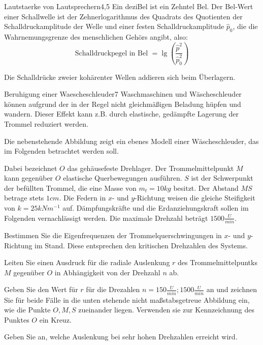 \begin{problem}{Lautstaerke von Lautsprechern}{4,5}
\hinweis Ein deziBel ist ein Zehntel Bel.  Der Bel-Wert einer Schallwelle ist der Zehnerlogarithmus des Quadrats des Quotienten der Schalldruckamplitude der Welle und einer festen Schalldruckamplitude $\hat{p}_0$, die die Wahrnemungsgrenze des menschlichen Gehörs angibt, also:
\begin{equation*}
  \mbox{Schalldruckpegel in Bel\ } = \lg\left(\frac{\hat{p}^2}{\hat{p}_0^2}\right)
\end{equation*}

Die Schalldrücke zweier kohärenter Wellen addieren sich beim Überlagern.
\begin{solution}
  
\end{solution}
\end{problem}

\begin{problem}{Beruhigung einer Waescheschleuder}{7}
Waschmaschinen und Wäscheschleuder können aufgrund der in der Regel nicht gleichmäßigen Beladung hüpfen und wandern. Dieser Effekt kann z.B. durch elastische, gedämpfte Lagerung der Trommel reduziert werden.

Die nebenstehende Abbildung zeigt ein ebenes Modell einer Wäscheschleuder, das im Folgenden betrachtet werden soll.


Dabei bezeichnet $O$ das gehäusefeste Drehlager.  Der Trommelmittelpunkt $M$ kann gegenüber $O$ elastische Querbewegungen ausführen.  $S$ ist der Schwerpunkt der befüllten Trommel, die eine Masse von $m_t=10\unit{kg}$ besitzt.  Der Abstand $MS$ betrage stets $1\unit{cm}$.  Die Federn in $x$- und $y$-Richtung weisen die gleiche Steifigkeit von $k=25\unit{kNm^{-1}}$ auf.  Dämpfungskräfte und die Erdanziehungskraft sollen im Folgenden vernachlässigt werden.  Die maximale Drehzahl beträgt $1500\unit{\frac U{min}}$.

\begin{abcenum}
  \item Bestimmen Sie die Eigenfrequenzen der Trommelquerschwingungen in $x$- und $y$-Richtung im Stand.  Diese entsprechen den kritischen Drehzahlen des Systems.
\item Leiten Sie einen Ausdruck für die radiale Auslenkung $r$ des Trommelmittelpuntks $M$ gegenüber $O$ in Abhängigkeit von der Drehzahl $n$ ab.
\item Geben Sie den Wert für $r$ für die Drezahlen $n=150\unit{\frac{U}{min}}; 1500\unit{\frac{U}{min}}$ an und zeichnen Sie für beide Fälle in die unten stehende nicht maßstabsgetreue Abbildung ein, wie die Punkte $O, M, S$ zueinander liegen.  Verwenden sie zur Kennzeichnung des Punktes $O$ ein Kreuz.
\item Geben Sie an, welche Auslenkung bei sehr hohen Drehzahlen erreicht wird.
\end{abcenum}


\end{problem}

